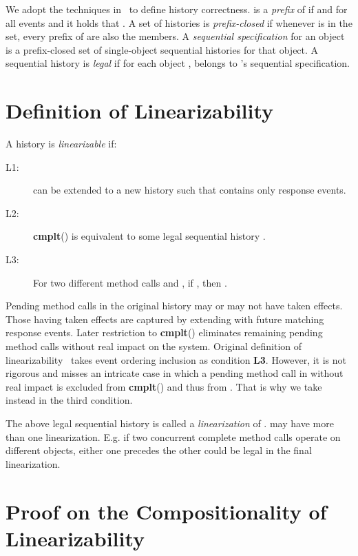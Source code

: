 \documentclass[a4paper,USenglish]{lipics-v2016}
\newcommand{\lin}{linearizability}
\newcommand{\linb}{linearizable}
\newcommand{\linz}{linearization}
\newcommand{\cmplt}{\textbf{cmplt}}
\newcommand{\his}{\text{H}}
\newcommand{\shis}{\text{S}}
\begin{document}
We adopt the techniques in~\cite{Herlihy90} to define history correctness.
 is a \textit{prefix} of  if 
and for all events  and  it holds that .
A set of histories is \textit{prefix-closed} if whenever {\his} is in the set, every prefix of {\his} are also the members. 
A \textit{sequential specification} for an object is a prefix-closed set of single-object sequential histories for that object.
A sequential history {\his} is \textit{legal} if for each object ,  belongs to 's sequential specification.

\section{Definition of Linearizability}\label{sec:def_lin}
\begin{definition}\label{def_lin}
	A history  is \textit{\linb} if:
	\begin{description}
		\item[L1:]
		{\his} can be extended to a new history  such that  contains only response events.
		\item[L2:]
		\cmplt() is equivalent to some legal sequential history {\shis}.
		\item[L3:]
		For two different method calls  and , if , then .
	\end{description}
\end{definition}

Pending method calls in the original history may or may not have taken effects.
Those having taken effects are captured by extending {\his} with  future matching response events.
Later restriction to \cmplt() eliminates remaining pending method calls without real impact on the system.
Original definition of {\lin}~\cite{Herlihy90} takes event ordering inclusion 
as condition \textbf{L3}.
However, it is not rigorous and misses an intricate case in which a pending method call in {\his} without real impact
is excluded from \cmplt() and thus from {\shis}.
That is why we take  instead in the third condition.

The above legal sequential history {\shis} is called a \textit{\linz} of .
 may have more than one \linz.
E.g. if two concurrent complete method calls  operate on different objects,
either one precedes the other could be legal in the final {\linz}.


\section{Proof on the Compositionality of Linearizability}\label{sec:comp}
\end{document}
